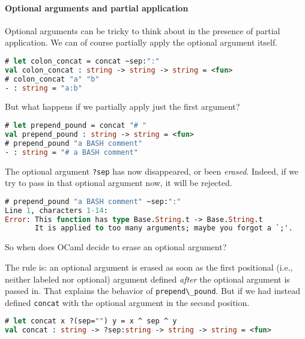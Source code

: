 \hypertarget{optional-arguments-and-partial-application}{%
\paragraph{Optional arguments and partial
application}\label{optional-arguments-and-partial-application}}

Optional arguments can be tricky to think about in the presence of
partial application. We can of course partially apply the optional
argument itself.

\begin{lstlisting}[language=Caml]
# let colon_concat = concat ~sep:":"
val colon_concat : string -> string -> string = <fun>
# colon_concat "a" "b"
- : string = "a:b"
\end{lstlisting}

But what happens if we partially apply just the first argument?

\begin{lstlisting}[language=Caml]
# let prepend_pound = concat "# "
val prepend_pound : string -> string = <fun>
# prepend_pound "a BASH comment"
- : string = "# a BASH comment"
\end{lstlisting}

The optional argument \passthrough{\lstinline!?sep!} has now
disappeared, or been \emph{erased}. Indeed, if we try to pass in that
optional argument now, it will be rejected.

\begin{lstlisting}[language=Caml]
# prepend_pound "a BASH comment" ~sep:":"
Line 1, characters 1-14:
Error: This function has type Base.String.t -> Base.String.t
       It is applied to too many arguments; maybe you forgot a `;'.
\end{lstlisting}

So when does OCaml decide to erase an optional argument?

The rule is: an optional argument is erased as soon as the first
positional (i.e., neither labeled nor optional) argument defined
\emph{after} the optional argument is passed in. That explains the
behavior of \passthrough{\lstinline!prepend\_pound!}. But if we had
instead defined \passthrough{\lstinline!concat!} with the optional
argument in the second position.

\begin{lstlisting}[language=Caml]
# let concat x ?(sep="") y = x ^ sep ^ y
val concat : string -> ?sep:string -> string -> string = <fun>
\end{lstlisting}


